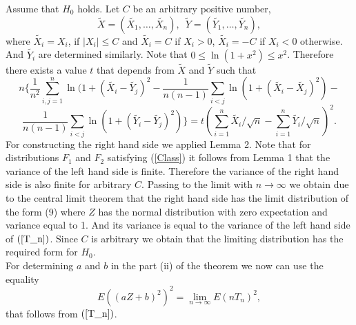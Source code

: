 \documentclass{svproc}
\begin{document}
Assume that $H_0$ holds. Let  $C$ be an arbitrary positive number,
$$
\tilde{X}=(\tilde{X_{1}},\ldots,\tilde{X_{n}}),\,\,\,
\tilde{Y}=(\tilde{Y_{1}},\ldots, \tilde{Y_{n}}),
$$
where $\tilde{X_{i}}=X_{i}$, if $
|X_{i}| \leq C$ and
 $\tilde{X_i}=C$ if $X_{i}>0$,
  $\tilde{X_i}=-C$ if $X_{i}<0$ otherwise. And $\tilde{Y_{i}}$ are determined similarly. Note that  $0 \leq \ln (1+x^2) \leq x^2$. Therefore there exists a value $t$ that depends from $\tilde{X}$ and $\tilde{Y}$ such that
\begin{equation}
n\{\frac{1}{n^2}\sum_{i,j=1}^n \ln(1 + (\tilde{X_{i}} - \tilde{Y_j})^2 -\frac{1}{n(n-1)}\sum_{i<j} \ln(1 + (\tilde{X_i} - \tilde{X_j})^2) -
\end{equation}
\begin{equation}\label{T_n}
 \frac{1}{n(n-1)}\sum_{i<j}  \ln(1 + (\tilde{Y_i} - \tilde{Y_j})^2)\}=
t
(\sum_{i=1}^n \tilde{X_{i}}/\sqrt{n}-\sum_{i=1}^n \tilde{Y_{i}}/\sqrt{n})^2.
\end{equation}
For constructing the right hand side we applied Lemma 2.
Note  that for distributions $F_1$ and $F_2$  satisfying (\ref{Class}) it follows from Lemma 1 that the variance of the left hand side is finite. Therefore the variance of the right hand side is also finite for arbitrary $C$.
Passing to the limit with $n\to \infty$ we obtain due to the central limit theorem that the right hand side has the limit distribution of the form (9) where  $Z$ has the normal distribution with zero expectation and variance equal to 1. And its variance  is equal to the variance of the left hand side  of $(\ref{T_n})$. Since $C$ is arbitrary we obtain that the limiting distribution has the required form for $H_0$. \\
 For determining $a$ and $b$ in the part (ii) of the theorem  we now can use the equality
 \begin{equation}\label{identity}
 E((aZ+b)^2)^2 =\lim_{n \to \infty}
 E(nT_n)^2,
 \end{equation}
 that follows from  $(\ref{T_n})$.
\end{document}
